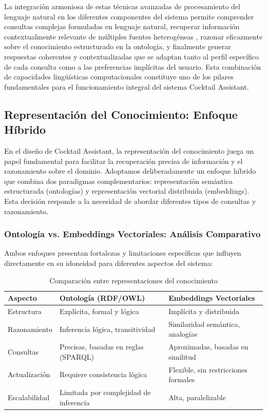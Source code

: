 \documentclass[runningheads]{llncs}
\begin{document}
La integración armoniosa de estas técnicas avanzadas de procesamiento del lenguaje natural en los diferentes componentes del sistema permite comprender consultas complejas formuladas en lenguaje natural, recuperar información contextualmente relevante de múltiples fuentes heterogéneas \cite{information_retrieval}, razonar eficazmente sobre el conocimiento estructurado en la ontología, y finalmente generar respuestas coherentes y contextualizadas que se adaptan tanto al perfil específico de cada consulta como a las preferencias implícitas del usuario. Esta combinación de capacidades lingüísticas computacionales constituye uno de los pilares fundamentales para el funcionamiento integral del sistema Cocktail Assistant.

\subsection{Representación del Conocimiento: Enfoque Híbrido}

En el diseño de Cocktail Assistant, la representación del conocimiento juega un papel fundamental para facilitar la recuperación precisa de información y el razonamiento sobre el dominio. Adoptamos deliberadamente un enfoque híbrido que combina dos paradigmas complementarios: representación semántica estructurada (ontologías) y representación vectorial distribuida (embeddings). Esta decisión responde a la necesidad de abordar diferentes tipos de consultas y razonamiento.

\subsubsection{Ontología vs. Embeddings Vectoriales: Análisis Comparativo}

Ambos enfoques presentan fortalezas y limitaciones específicas que influyen directamente en su idoneidad para diferentes aspectos del sistema:

\begin{table}[h]
\centering
\caption{Comparación entre representaciones del conocimiento}
\begin{tabular}{p{3cm}|p{5.5cm}|p{5.5cm}}
\hline
\textbf{Aspecto} & \textbf{Ontología (RDF/OWL)} & \textbf{Embeddings Vectoriales} \\
\hline
Estructura & Explícita, formal y lógica & Implícita y distribuida \\
\hline
Razonamiento & Inferencia lógica, transitividad & Similaridad semántica, analogías \\
\hline
Consultas & Precisas, basadas en reglas (SPARQL) & Aproximadas, basadas en similitud \\
\hline
Actualización & Requiere consistencia lógica & Flexible, sin restricciones formales \\
\hline
Escalabilidad & Limitada por complejidad de inferencia & Alta, paralelizable \\
\hline
\end{tabular}
\end{table}
\end{document}
